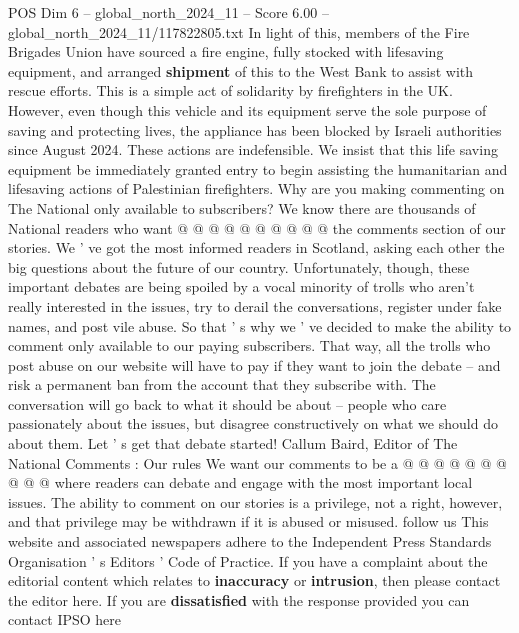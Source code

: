 \begin{textsample}{POS Dim 6 – global\_north\_2024\_11 – Score 6.00 – global\_north\_2024\_11/117822805.txt}
In light of this, members of the Fire Brigades Union have sourced a fire engine, fully stocked with lifesaving equipment, and arranged \textbf{shipment} of this to the West Bank to assist with rescue efforts.
This is a simple act of solidarity by firefighters in the UK.
However, even though this vehicle and its equipment serve the sole purpose of saving and protecting lives, the appliance has been blocked by Israeli authorities since August 2024.
These actions are indefensible.
We insist that this life saving equipment be immediately granted entry to begin assisting the humanitarian and lifesaving actions of Palestinian firefighters.
Why are you making commenting on The National only available to subscribers?
We know there are thousands of National readers who want @ @ @ @ @ @ @ @ @ @ the comments section of our stories.
We ' ve got the most informed readers in Scotland, asking each other the big questions about the future of our country.
Unfortunately, though, these important debates are being spoiled by a vocal minority of trolls who aren't really interested in the issues, try to derail the conversations, register under fake names, and post vile abuse.
So that ' s why we ' ve decided to make the ability to comment only available to our paying subscribers.
That way, all the trolls who post abuse on our website will have to pay if they want to join the debate -- and risk a permanent ban from the account that they subscribe with.
The conversation will go back to what it should be about -- people who care passionately about the issues, but disagree constructively on what we should do about them.
Let ' s get that debate started!
Callum Baird, Editor of The National Comments : Our rules We want our comments to be a @ @ @ @ @ @ @ @ @ @ where readers can debate and engage with the most important local issues.
The ability to comment on our stories is a privilege, not a right, however, and that privilege may be withdrawn if it is abused or misused. follow us This website and associated newspapers adhere to the Independent Press Standards Organisation ' s Editors ' Code of Practice.
If you have a complaint about the editorial content which relates to \textbf{inaccuracy} or \textbf{intrusion}, then please contact the editor here.
If you are \textbf{dissatisfied} with the response provided you can contact IPSO here

\end{textsample}
